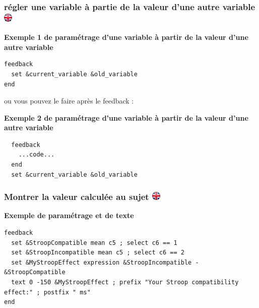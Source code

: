 \documentclass[
]{book}
\begin{document}
\hypertarget{ruxe9gler-une-variable-uxe0-partie-de-la-valeur-dune-autre-variable-ukflag}{%
\subsubsection[régler une variable à partie de la valeur d'une autre
variable ]{\texorpdfstring{régler une variable à partie de la valeur
d'une autre variable
\href{https://www.psytoolkit.org/doc3.1.0/feedback.html\#__just_set_a_variable_to_the_value_of_another_variable}{\protect\includegraphics{img/ukflag.png}}}{régler une variable à partie de la valeur d'une autre variable ukflag}}\label{ruxe9gler-une-variable-uxe0-partie-de-la-valeur-dune-autre-variable-ukflag}}

\textbf{Exemple 1 de paramétrage d'une variable à partir de la valeur
d'une autre variable}

\begin{verbatim}
feedback
  set &current_variable &old_variable
end
\end{verbatim}

ou vous pouvez le faire après le feedback :

\textbf{Exemple 2 de paramétrage d'une variable à partir de la valeur
d'une autre variable}

\begin{verbatim}
  feedback
    ...code...
  end
  set &current_variable &old_variable
\end{verbatim}

\hypertarget{montrer-la-valeur-calculuxe9e-au-sujet-ukflag}{%
\subsubsection[Montrer la valeur calculée au sujet
]{\texorpdfstring{Montrer la valeur calculée au sujet
\href{https://www.psytoolkit.org/doc3.1.0/feedback.html\#_show_calculated_values_to_participant}{\protect\includegraphics{img/ukflag.png}}}{Montrer la valeur calculée au sujet ukflag}}\label{montrer-la-valeur-calculuxe9e-au-sujet-ukflag}}

\textbf{Exemple de paramétrage et de texte}

\begin{verbatim}
feedback
  set &StroopCompatible mean c5 ; select c6 == 1
  set &StroopIncompatible mean c5 ; select c6 == 2
  set &MyStroopEffect expression &StroopIncompatible - &StroopCompatible
  text 0 -150 &MyStroopEffect ; prefix "Your Stroop compatibility effect:" ; postfix " ms"
end
\end{verbatim}
\end{document}
